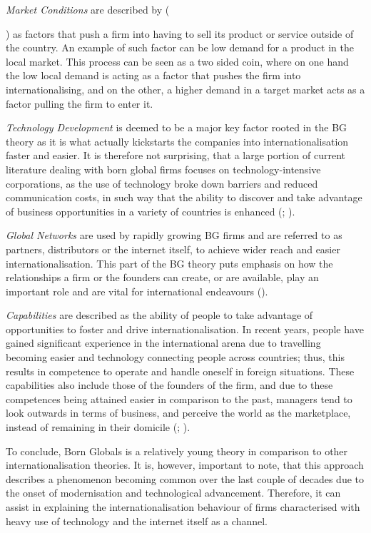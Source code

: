 \documentclass[11pt,a4paper]{article}
\begin{document}
{\textit{Market Conditions} are described by \citeauthor{madsenInternationalizationBornGlobals1997} ({\citeyear{madsenInternationalizationBornGlobals1997}) as factors that push a firm into having to sell its product or service outside of the country. An example of such factor can be low demand for a product in the local market. This process can be seen as a two sided coin, where on one hand the low local demand is acting as a factor that pushes the firm into internationalising, and on the other, a higher demand in a target market acts as a factor pulling the firm to enter it. \par
\textit{Technology Development} is deemed to be a major key factor rooted in the BG theory as it is what actually kickstarts the companies into internationalisation faster and easier. It is therefore not surprising, that a large portion of current literature dealing with born global firms focuses on technology-intensive corporations, as the use of technology broke down barriers and reduced communication costs, in such way that the ability to discover and take advantage of business opportunities in a variety of countries is enhanced (\cite{oviattTheoryInternationalNew1994}; \cite{knightInternationalizationIncrementalBorn2016}). \par
\textit{Global Networks} are used by rapidly growing BG firms and are referred to as partners, distributors or the internet itself, to achieve wider reach and easier internationalisation. This part of the BG theory puts emphasis on how the relationships a firm or the founders can create, or are available, play an important role and are vital for international endeavours (\cite{fletcherInternationalEntrepreneurshipBorn2011}). \par
\textit{Capabilities} are described as the ability of people to take advantage of opportunities to foster and drive internationalisation. In recent years, people have gained significant experience in the international arena due to travelling becoming easier and technology connecting people across countries; thus, this results in competence to operate and handle oneself in foreign situations. These capabilities also include those of the founders of the firm, and due to these competences being attained easier in comparison to the past, managers tend to look outwards in terms of business, and perceive the world as the marketplace, instead of remaining in their domicile (\cite{madsenInternationalizationBornGlobals1997}; \cite{rialpBornglobalPhenomenonComparative2005}). \par
To conclude, Born Globals is a relatively young theory in comparison to other internationalisation theories. It is, however, important to note, that this approach describes a phenomenon becoming common over the last couple of decades due to the onset of modernisation and technological advancement. Therefore, it can assist in explaining the internationalisation behaviour of firms characterised with heavy use of technology and the internet itself as a channel. 



}}
\end{document}
